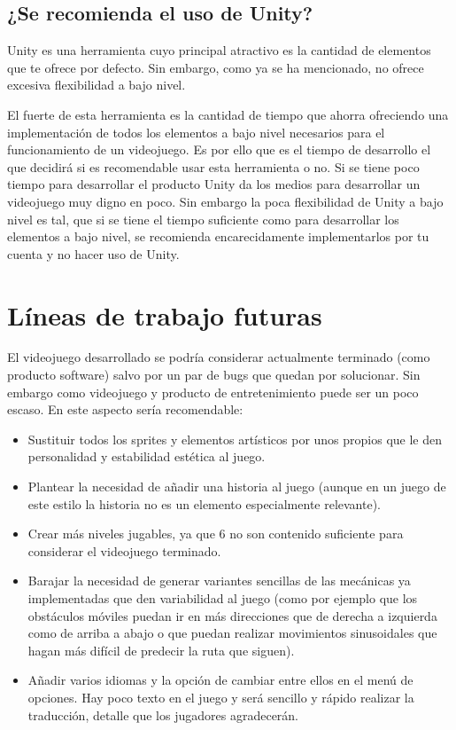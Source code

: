 \subsection{¿Se recomienda el uso de Unity?}
Unity es una herramienta cuyo principal atractivo es la cantidad de elementos que te ofrece por defecto. Sin embargo, como ya se ha mencionado, no ofrece excesiva flexibilidad a bajo nivel.

El fuerte de esta herramienta es la cantidad de tiempo que ahorra ofreciendo una implementación de todos los elementos a bajo nivel necesarios para el funcionamiento de un videojuego. Es por ello que es el tiempo de desarrollo el que decidirá si es recomendable usar esta herramienta o no. Si se tiene poco tiempo para desarrollar el producto Unity da los medios para desarrollar un videojuego muy digno en poco. Sin embargo la poca flexibilidad de Unity a bajo nivel es tal, que si se tiene el tiempo suficiente como para desarrollar los elementos a bajo nivel, se recomienda encarecidamente implementarlos por tu cuenta y no hacer uso de Unity.

\section{Líneas de trabajo futuras}
El videojuego desarrollado se podría considerar actualmente terminado (como producto software) salvo por un par de bugs que quedan por solucionar. Sin embargo como videojuego y producto de entretenimiento puede ser un poco escaso.
En este aspecto sería recomendable:
\begin{itemize}
\item
Sustituir todos los sprites y elementos artísticos por unos propios que le den personalidad y estabilidad estética al juego.
\item
Plantear la necesidad de añadir una historia al juego (aunque en un juego de este estilo la historia no es un elemento especialmente relevante).
\item
Crear más niveles jugables, ya que 6 no son contenido suficiente para considerar el videojuego terminado.
\item
Barajar la necesidad de generar variantes sencillas de las mecánicas ya implementadas que den variabilidad al juego (como por ejemplo que los obstáculos móviles puedan ir en más direcciones que de derecha a izquierda como de arriba a abajo o que puedan realizar movimientos sinusoidales que hagan más difícil de predecir la ruta que siguen).
\item
Añadir varios idiomas y la opción de cambiar entre ellos en el menú de opciones. Hay poco texto en el juego y será sencillo y rápido realizar la traducción, detalle que los jugadores agradecerán.
\end{itemize}

